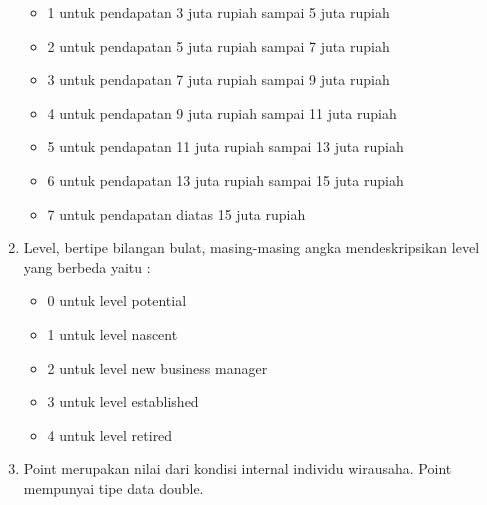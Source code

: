 \begin{enumerate}
\begin{itemize}
			\item 1 untuk pendapatan 3 juta rupiah sampai 5 juta rupiah
			\item 2 untuk pendapatan 5 juta rupiah sampai 7 juta rupiah
			\item 3 untuk pendapatan 7 juta rupiah sampai 9 juta rupiah
			\item 4 untuk pendapatan 9 juta rupiah sampai 11 juta rupiah
			\item 5 untuk pendapatan 11 juta rupiah sampai 13 juta rupiah
			\item 6 untuk pendapatan 13 juta rupiah sampai 15 juta rupiah
			\item 7 untuk pendapatan diatas 15 juta rupiah
			\end{itemize}
		\item Level, bertipe bilangan bulat, masing-masing angka mendeskripsikan level yang berbeda yaitu :
			\begin{itemize}
			\item 0 untuk level potential
			\item 1 untuk level nascent
			\item 2 untuk level new business manager
			\item 3 untuk level established 
			\item 4 untuk level retired
			\end{itemize}
		\item Point merupakan nilai dari kondisi internal individu wirausaha. Point mempunyai tipe data double.
\end{enumerate}

